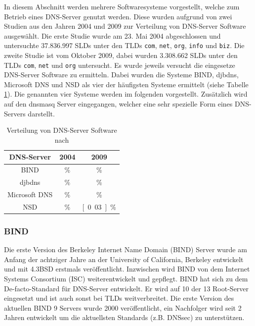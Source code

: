 \documentclass[a4paper, 12pt, BCOR10mm, DIV12, toc=bibliography, toc=listof, german]{scrbook}
\begin{document}
				In diesem Abschnitt werden mehrere Softwaresysteme vorgestellt, welche zum Betrieb eines
				DNS-Server genutzt werden. Diese wurden aufgrund von zwei Studien aus den Jahren 2004 und
				2009 zur Verteilung von DNS-Server Software ausgewählt. Die erste Studie \cite{survey2004}
				wurde am 23. Mai 2004 abgeschlossen und untersuchte 37.836.997 SLDs unter den TLDs
				\texttt{com}, \texttt{net}, \texttt{org},	\texttt{info} und \texttt{biz}. Die zweite Studie
				\cite{survey2009} ist vom Oktober 2009, dabei wurden 3.308.662 SLDs unter den TLDs
				\texttt{com}, \texttt{net} und \texttt{org} untersucht. Es wurde jeweils versucht die
				eingesetze DNS-Server Software zu ermitteln. Dabei wurden die Systeme BIND, djbdns,
				Microsoft DNS und NSD als vier der häufigsten Systeme ermittelt (siehe Tabelle
				\ref{tab:verteilung}). Die genannten vier Systeme werden im folgenden vorgestellt.
				Zusätzlich wird auf den dnsmasq Server eingegangen, welcher eine sehr spezielle Form eines
				DNS-Servers darstellt.
				
				\begin{table}
					\centering
					\begin{tabular}{|c|c|c|}\hline
						DNS-Server & 2004 & 2009 \\\hline\hline
						BIND & \unit[70,11]{\%} & \unit[73,85]{\%} \\
						djbdns & \unit[15,57]{\%} & \unit[2,56]{\%} \\
						Microsoft DNS & \unit[6,24]{\%} & \unit[0,26]{\%}\\
						NSD & \unit[0,20]{\%} & \unit[0.03]{\%} \\\hline
					\end{tabular}
					\caption{Verteilung von DNS-Server Software nach \cite{survey2004, survey2009}}
					\label{tab:verteilung}
				\end{table}

				\subsubsection*{BIND} %

				Die erste Version des Berkeley Internet Name Domain
				(BIND) \cite{bind} Server wurde am Anfang der achtziger Jahre
				an der University of California, Berkeley entwickelt und mit 4.3BSD erstmals
				veröffentlicht. Inzwischen wird BIND von dem Internet Systems Consortium (ISC)
				weiterentwickelt und gepflegt. BIND hat sich zu dem De-facto-Standard für DNS-Server
				entwickelt. Er wird auf 10 der 13 Root-Server eingesetzt und ist auch sonst bei TLDs
				weitverbreitet. Die erste Version des aktuellen BIND 9 Servers wurde 2000 veröffentlicht,
				ein Nachfolger wird seit 2 Jahren entwickelt um die aktuellsten Standards (z.B.  DNSsec) zu
				unterstützen.
\end{document}
